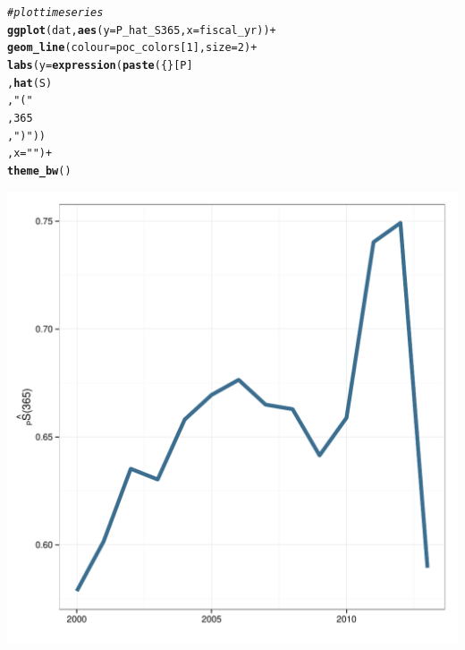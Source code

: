 \documentclass[12pt]{article}\usepackage[]{graphicx}\usepackage[]{color}
\makeatletter
\def\maxwidth{ %
  \ifdim\Gin@nat@width>\linewidth
    \linewidth
  \else
    \Gin@nat@width
  \fi
}
\newcommand{\hlnum}[1]{\textcolor[rgb]{0.686,0.059,0.569}{#1}}%
\newcommand{\hlstr}[1]{\textcolor[rgb]{0.192,0.494,0.8}{#1}}%
\newcommand{\hlcom}[1]{\textcolor[rgb]{0.678,0.584,0.686}{\textit{#1}}}%
\newcommand{\hlopt}[1]{\textcolor[rgb]{0,0,0}{#1}}%
\newcommand{\hlstd}[1]{\textcolor[rgb]{0.345,0.345,0.345}{#1}}%
\newcommand{\hlkwc}[1]{\textcolor[rgb]{0.333,0.667,0.333}{#1}}%
\newcommand{\hlkwd}[1]{\textcolor[rgb]{0.737,0.353,0.396}{\textbf{#1}}}%
\newenvironment{kframe}{%
 \def\at@end@of@kframe{}%
 \ifinner\ifhmode%
  \def\at@end@of@kframe{\end{minipage}}%
  \begin{minipage}{\columnwidth}%
 \fi\fi%
 \def\FrameCommand##1{\hskip\@totalleftmargin \hskip-\fboxsep
 \colorbox{shadecolor}{##1}\hskip-\fboxsep
     \hskip-\linewidth \hskip-\@totalleftmargin \hskip\columnwidth}%
 \MakeFramed {\advance\hsize-\width
   \@totalleftmargin\z@ \linewidth\hsize
   \@setminipage}}%
 {\par\unskip\endMakeFramed%
 \at@end@of@kframe}
\newenvironment{knitrout}{}{} %
\makeatother
\begin{document}
\begin{knitrout}
\begin{kframe}
\begin{alltt}
\hlcom{#plot time series}
\hlkwd{ggplot}\hlstd{(dat,} \hlkwd{aes}\hlstd{(}\hlkwc{y}\hlstd{=P_hat_S365,} \hlkwc{x}\hlstd{=fiscal_yr))} \hlopt{+}
  \hlkwd{geom_line}\hlstd{(}\hlkwc{colour}\hlstd{=poc_colors[}\hlnum{1}\hlstd{],} \hlkwc{size}\hlstd{=}\hlnum{2}\hlstd{)} \hlopt{+}
  \hlkwd{labs}\hlstd{(}\hlkwc{y} \hlstd{=} \hlkwd{expression}\hlstd{(}\hlkwd{paste}\hlstd{(\{\}[P]}
                            \hlstd{,}\hlkwd{hat}\hlstd{(S)}
                            \hlstd{,}\hlstr{"("}
                            \hlstd{,}\hlnum{365}
                            \hlstd{,}\hlstr{")"}\hlstd{))}
       \hlstd{,}\hlkwc{x} \hlstd{=} \hlstr{""}\hlstd{)} \hlopt{+}
  \hlkwd{theme_bw}\hlstd{()}
\end{alltt}
\end{kframe}
\includegraphics[width=\maxwidth]{figure/p_hat_S} 

\end{knitrout}
\end{document}
